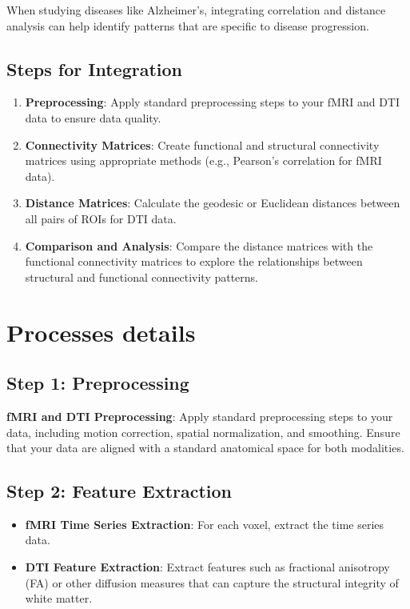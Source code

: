 \documentclass[twocolumn]{article}
\begin{document}
When studying diseases like Alzheimer's, integrating correlation and distance analysis can help identify patterns that are specific to disease
progression.

\subsection{Steps for Integration}

\begin{enumerate}
\item \textbf{Preprocessing}: Apply standard preprocessing steps to your fMRI and DTI data to ensure data quality.
\item \textbf{Connectivity Matrices}: Create functional and structural connectivity matrices using appropriate methods (e.g., Pearson's correlation for
fMRI data).
\item \textbf{Distance Matrices}: Calculate the geodesic or Euclidean distances between all pairs of ROIs for DTI data.
\item \textbf{Comparison and Analysis}: Compare the distance matrices with the functional connectivity matrices to explore the relationships between
structural and functional connectivity patterns.
\end{enumerate}

\section{Processes details}
\subsection{ Step 1: Preprocessing}
\textbf{fMRI and DTI Preprocessing}: Apply standard preprocessing steps to your data, including motion correction, spatial normalization, and
smoothing. Ensure that your data are aligned with a standard anatomical space for both modalities.

\subsection{ Step 2: Feature Extraction}
\begin{itemize}
\item \textbf{fMRI Time Series Extraction}: For each voxel, extract the time series data.
\item \textbf{DTI Feature Extraction}: Extract features such as fractional anisotropy (FA) or other diffusion measures that can capture the structural
integrity of white matter.
\end{itemize}
\end{document}
